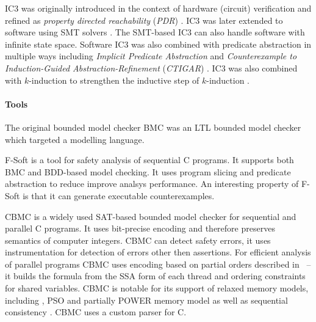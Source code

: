 IC3 was originally introduced in the context of hardware (circuit) verification  and refined as \emph{property directed reachability} (\emph{PDR}) .
IC3 was later extended to software using SMT solvers .
The SMT-based IC3 can also handle software with infinite state space.
Software IC3 was also combined with predicate abstraction in multiple ways including \emph{Implicit Predicate Abstraction}  and \emph{Counterexample to Induction-Guided Abstraction-Refinement} (\emph{CTIGAR}) .
IC3 was also combined with $k$-induction to strengthen the inductive step of $k$-induction .

\paragraph{Tools}

The original bounded model checker BMC  was an LTL bounded
model checker which targeted a modelling language.

F-Soft  is a tool for safety analysis of sequential C programs.
It supports both BMC and BDD-based model checking.
It uses program slicing and predicate abstraction to reduce improve analsys performance.
An interesting property of F-Soft is that it can generate executable counterexamples.

CBMC  is a widely used SAT-based bounded
model checker for sequential and parallel C programs.
It uses bit-precise encoding and therefore preserves semantics of computer
integers.
CBMC can detect safety errors, it uses instrumentation for detection of errors
other then assertions.
For efficient analysis of parallel programs CBMC uses encoding based on partial
orders described in~ -- it builds the formula from the SSA
form of each thread and ordering constraints for shared variables.
CBMC is notable for its support of relaxed memory models, including \xtso,
PSO and partially POWER memory model as well as sequential consistency .
CBMC uses a custom parser for C.

